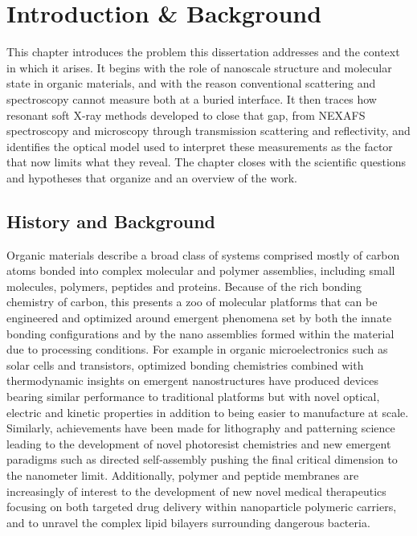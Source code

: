 \chapter{Introduction \& Background}\label{chap:introduction}

This chapter introduces the problem this dissertation addresses and the context in which it arises. It begins with the role of nanoscale structure and molecular state in organic materials, and with the reason conventional scattering and spectroscopy cannot measure both at a buried interface. It then traces how resonant soft X-ray methods developed to close that gap, from NEXAFS spectroscopy and microscopy through transmission scattering and reflectivity, and identifies the optical model used to interpret these measurements as the factor that now limits what they reveal. The chapter closes with the scientific questions and hypotheses that organize  and an overview of the work.

\section{History and Background}\label{sec:history-and-background}

Organic materials describe a broad class of systems comprised mostly of carbon atoms bonded into complex molecular and polymer assemblies, including small molecules, polymers, peptides and proteins. Because of the rich bonding chemistry of carbon, this presents a zoo of molecular platforms that can be engineered and optimized around emergent phenomena set by both the innate bonding configurations and by the nano assemblies formed within the material due to processing conditions. For example in organic microelectronics such as solar cells and transistors, optimized bonding chemistries combined with thermodynamic insights on emergent nanostructures have produced devices bearing similar performance to traditional platforms but with novel optical, electric and kinetic properties in addition to being easier to manufacture at scale.\autocite{alqahtaniGreenAdditiveLimits2023a,collinsAbsoluteMeasurementDomain2013,alqahtaniMixedDomainsEnhance2018,chen202EfficiencyOrganic2024} Similarly, achievements have been made for lithography and patterning science leading to the development of novel photoresist chemistries and new emergent paradigms such as directed self-assembly pushing the final critical dimension to the nanometer limit.\autocite{adamsPolymerSequenceAlters2025,sundayDepthProfilingChemical2026,prabhuPhotoresistLatentDeveloper2011} Additionally, polymer and peptide membranes are increasingly of interest to the development of new novel medical therapeutics focusing on both targeted drug delivery within nanoparticle polymeric carriers, and to unravel the complex lipid bilayers surrounding dangerous bacteria.\autocite{grabnerMolecularWeightIndependentPolysoap2024,ozturkHighlyTailasymmetricLipids2025}

